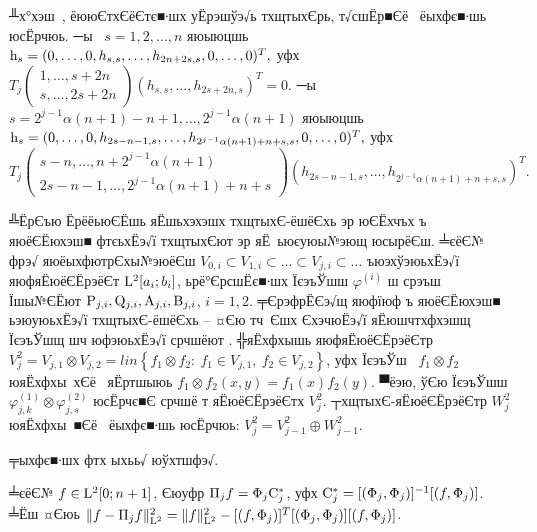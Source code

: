 \documentclass[12pt, a4paper, oneside]{article}
\begin{document}
 \par ╨х°хэш , ёююЄтхЄёЄтє■∙шх уЁрэшўэ√ь тхщтыхЄрь, т√сшЁр■Єё  ёыхфє■∙шь юсЁрчюь. ─ы  $s=1,2,\dots,n$ яюыюцшь
${\rm h}_{s}=(0,\dots,0,h_{s,s},\dots,h_{2n+2s,s},0,\dots,0)^T,$
уфх $ T_j\left(\begin{smallmatrix} 1,\dots,s+2n \\ s,\dots,2s+2n\end{smallmatrix} \right)(h_{s,s},\dots,h_{2s+2n,s})^T=0.$
─ы  $s=2^{j-1}\alpha (n+1)-n+1,\dots ,2^{j-1}\alpha (n+1)$ яюыюцшь ${\rm h}_{s}=(0,\dots,0,h_{2s-n-1,s},\dots,h_{2^{j-1}\alpha (n+1)+n+s,s},0,\dots,0)^T,$ уфх
\[
T_j\left(\begin{smallmatrix} s-n,\dots,n+2^{j-1}\alpha (n+1) \\ 2s-n-1,\dots,2^{j-1}\alpha (n+1)+n+s \end{smallmatrix} \right)(h_{2s-n-1,s},\dots,h_{2^{j-1}\alpha (n+1)+n+s,s})^T.
\]
\par ╩ЁрЄъю ЁрёёьюЄЁшь яЁшьхэхэшх тхщтыхЄ-ёшёЄхь эр юЄЁхчъх ъ яюёЄЁюхэш■ фтєьхЁэ√ї тхщтыхЄют эр яЁ ьюєуюы№эющ юсырёЄш. ╧єёЄ№ фрэ√ яюёыхфютрЄхы№эюёЄш $V_{0,i} \subset V_{1,i} \subset \ldots \subset V_{j,i} \subset \ldots$ ъюэхўэюьхЁэ√ї яюфяЁюёЄЁрэёЄт ${\rm L}^{2} [a_{i} ;b_{i} ]$, ьрё°ЄрсшЁє■∙шх ЇєэъЎшш $\varphi ^{(i)} $ ш срэъш Їшы№ЄЁют ${\rm P}_{j,i} ,{\rm Q}_{j,i} ,{\rm A}_{j,i} ,{\rm B}_{j,i} $, $ i=1,2$. ╤ЄрэфрЁЄэ√щ яюфїюф ъ яюёЄЁюхэш■ ьэюуюьхЁэ√ї тхщтыхЄ-ёшёЄхь -- ¤Єю тч Єшх ЄхэчюЁэ√ї яЁюшчтхфхэшщ ЇєэъЎшщ шч юфэюьхЁэ√ї срчшёют \cite{Novikov}. ╬яЁхфхышь яюфяЁюёЄЁрэёЄтр $V_{j}^{2} =V_{j,1} \otimes V_{j,2} = lin\left\{f_{1} \otimes f_{2} :~f_{1} \in V_{j,1} ,~f_{2} \in V_{j,2} \right\}$, уфх ЇєэъЎш  $f_{1} \otimes f_{2} $ юяЁхфхы хЄё  яЁртшыюь $f_{1} \otimes f_{2} \left(x,y\right)=f_{1} (x)f_{2} (y)$. ▀ёэю, ўЄю ЇєэъЎшш $\varphi _{j,k}^{(1)} \otimes \varphi _{j,s}^{(2)} $ юсЁрчє■Є срчшё т яЁюёЄЁрэёЄтх $V_{j}^{2} $.  ┬хщтыхЄ-яЁюёЄЁрэёЄтр $W_{j}^{2} $ юяЁхфхы ■Єё  ёыхфє■∙шь юсЁрчюь: $V_{j}^{2} =V_{j-1}^{2} \oplus W_{j-1}^{2} $.
\par ╤ыхфє■∙шх фтх ыхьь√ юўхтшфэ√.
\begin{Lem} \label{lem61}
╧єёЄ№ $f\in {\rm L}^{2}[0;n+1]$, Єюуфр $\Pi _{j} f=\Phi _{j} {\rm C}_{j}^{*} $, уфх ${\rm C}_{j}^{*} =[(\Phi _{j} ,\Phi _{j})]^{-1}[(f,\Phi _{j})]$. ╧Ёш ¤Єюь $\| f-\Pi _{j} f\| _{{\rm L}^{2} }^{2} =\| f\| _{{\rm L}^{2} }^{2} -[(f,\Phi _{j})]^{T}[(\Phi _{j} ,\Phi _{j})][(f,\Phi _{j})]$.
\end{Lem}
\end{document}
